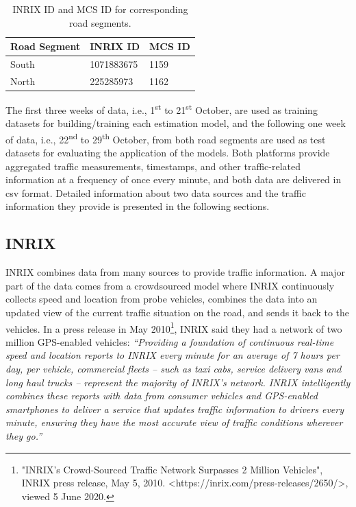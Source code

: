 \documentclass[english]{kththesis}
\begin{document}
\begin{table}[!ht]
\centering
\begin{tabular}{@{}lll@{}}
\toprule
\textbf{Road Segment} & \textbf{INRIX ID} & \textbf{MCS ID} \\
\midrule
South          & 1071883675 & 1159     \\
North          & 225285973  & 1162     \\ 
\bottomrule
\end{tabular}
\caption{INRIX ID and MCS ID for corresponding road segments.}
\label{tab:segmentIDs}
\end{table}

The first three weeks of data, i.e., 1\textsuperscript{st} to 21\textsuperscript{st} October, are used as training datasets for building/training each estimation model, and the following one week of data, i.e., 22\textsuperscript{nd} to 29\textsuperscript{th} October, from both road segments are used as test datasets for evaluating the application of the models. Both platforms provide aggregated traffic measurements, timestamps, and other traffic-related information at a frequency of once every minute, and both data are delivered in \gls{csv} format. Detailed information about two data sources and the traffic information they provide is presented in the following sections.

\subsection{INRIX}
\label{subsec:inrix}
INRIX combines data from many sources to provide traffic information. A major part of the data comes from a crowdsourced model where INRIX continuously collects speed and location from probe vehicles, combines the data into an updated view of the current traffic situation on the road, and sends it back to the vehicles. In a press release in May 2010\footnote{"INRIX’s Crowd-Sourced Traffic Network Surpasses 2 Million Vehicles", INRIX press release, May 5, 2010. <https://inrix.com/press-releases/2650/>, viewed 5 June 2020.}, INRIX said they had a network of two million GPS-enabled vehicles: \textit{“Providing a foundation of continuous real-time speed and location reports to INRIX every minute for an average of 7 hours per day, per vehicle, commercial fleets – such as taxi cabs, service delivery vans and long haul trucks – represent the majority of INRIX’s network. INRIX intelligently combines these reports with data from consumer vehicles and GPS-enabled smartphones to deliver a service that updates traffic information to drivers every minute, ensuring they have the most accurate view of traffic conditions wherever they go.”}
\end{document}
